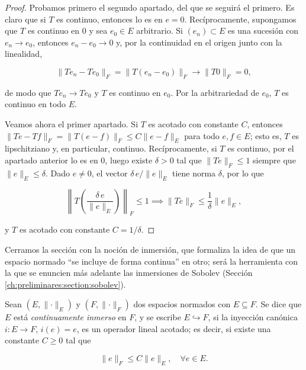 \begin{proof}
Probamos primero el segundo apartado, del que se seguirá el primero. Es claro que
si $T$ es continuo, entonces lo es en $e = 0$. Recíprocamente, supongamos que $T$
es continuo en $0$ y sea $e_0 \in E$ arbitrario. Si $(e_n) \subset E$ es una
sucesión con $e_n \rightarrow e_0$, entonces $e_n - e_0 \rightarrow 0$ y, por la
continuidad en el origen junto con la linealidad,

\[\lVert Te_n - Te_0 \rVert_F = \lVert T(e_n - e_0) \rVert_F \rightarrow \lVert T0 \rVert_F = 0,\]

de modo que $Te_n \rightarrow Te_0$ y $T$ es continuo en $e_0$. Por la
arbitrariedad de $e_0$, $T$ es continuo en todo $E$.

Veamos ahora el primer apartado. Si $T$ es acotado con constante $C$, entonces
$\lVert Te - Tf \rVert_F = \lVert T(e - f) \rVert_F \leq C \lVert e - f \rVert_E$
para todo $e, f \in E$; esto es, $T$ es lipschitziano y, en particular, continuo.
Recíprocamente, si $T$ es continuo, por el apartado anterior lo es en $0$, luego
existe $\delta > 0$ tal que $\lVert Te \rVert_F \leq 1$ siempre que
$\lVert e \rVert_E \leq \delta$. Dado $e \neq 0$, el vector
$\delta \, e / \lVert e \rVert_E$ tiene norma $\delta$, por lo que

\[\left\lVert T\!\left(\frac{\delta \, e}{\lVert e \rVert_E}\right)\right\rVert_F \leq 1 \implies \lVert Te \rVert_F \leq \frac{1}{\delta} \lVert e \rVert_E,\]

y $T$ es acotado con constante $C = 1/\delta$.
\end{proof}

Cerramos la sección con la noción de inmersión, que formaliza la idea de que un
espacio normado ``se incluye de forma continua'' en otro; será la herramienta con
la que se enuncien más adelante las inmersiones de Sobolev
(Sección \ref{ch:preliminares:section:sobolev}).\\

\begin{Definicion}
\label{ch:preliminares:def:inmersion}

Sean $(E, \lVert \cdot \rVert_E)$ y $(F, \lVert \cdot \rVert_F)$ dos espacios
normados con $E \subseteq F$. Se dice que $E$ está \textit{continuamente inmerso}
en $F$, y se escribe $E \hookrightarrow F$, si la inyección canónica
$i : E \rightarrow F$, $i(e) = e$, es un operador lineal acotado; es decir, si
existe una constante $C \geq 0$ tal que

\[\lVert e \rVert_F \leq C \lVert e \rVert_E, \quad \forall e \in E.\]
\end{Definicion}

